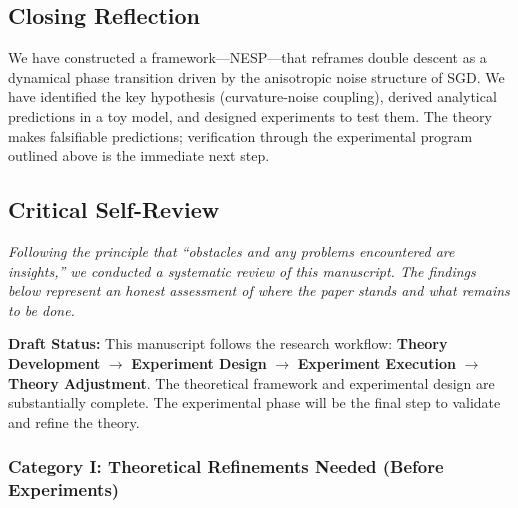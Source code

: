 \documentclass[
  journal=largetwo,
  year=2025,
  volume=37,
]{cup-journal}
\begin{document}
\subsection{Closing Reflection}

We have constructed a framework---NESP---that reframes double descent as a dynamical phase transition driven by the anisotropic noise structure of SGD. We have identified the key hypothesis (curvature-noise coupling), derived analytical predictions in a toy model, and designed experiments to test them. The theory makes falsifiable predictions; verification through the experimental program outlined above is the immediate next step.

\subsection{Critical Self-Review}\label{app:self_review}

\textit{Following the principle that ``obstacles and any problems encountered are insights,'' we conducted a systematic review of this manuscript. The findings below represent an honest assessment of where the paper stands and what remains to be done.}

\textbf{Draft Status:} This manuscript follows the research workflow: \textbf{Theory Development} $\to$ \textbf{Experiment Design} $\to$ \textbf{Experiment Execution} $\to$ \textbf{Theory Adjustment}. The theoretical framework and experimental design are substantially complete. The experimental phase will be the final step to validate and refine the theory.

\subsubsection*{Category I: Theoretical Refinements Needed (Before Experiments)}
\end{document}
